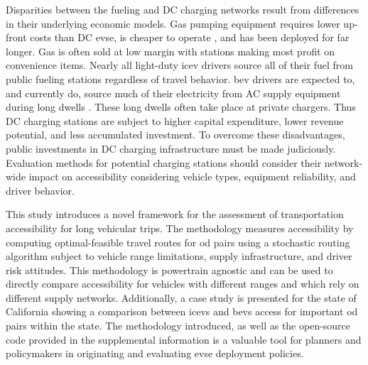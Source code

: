 Disparities between the fueling and DC charging networks result from differences in their underlying economic models. Gas pumping equipment requires lower up-front costs than DC \gls{evse}, is cheaper to operate \cite{Gamage_2023}, and has been deployed for far longer. Gas is often sold at low margin with stations making most profit on convenience items. Nearly all light-duty \gls{icev} drivers source all of their fuel from public fueling stations regardless of travel behavior. \gls{bev} drivers are expected to, and currently do, source much of their electricity from AC supply equipment during long dwells \cite{Hardman_2018}. These long dwells often take place at private chargers. Thus DC charging stations are subject to higher capital expenditure, lower revenue potential, and less accumulated investment. To overcome these disadvantages, public investments in DC charging infrastructure must be made judiciously. Evaluation methods for potential charging stations should consider their network-wide impact on accessibility considering vehicle types, equipment reliability, and driver behavior.

This study introduces a novel framework for the assessment of transportation accessibility for long vehicular trips. The methodology measures accessibility by computing optimal-feasible travel routes for \gls{od} pairs using a stochastic routing algorithm subject to vehicle range limitations, supply infrastructure, and driver risk attitudes. This methodology is powertrain agnostic and can be used to directly compare accessibility for vehicles with different ranges and which rely on different supply networks. Additionally, a case study is presented for the state of California showing a comparison between \glspl{icev} and \glspl{bev} access for important \gls{od} pairs within the state. The methodology introduced, as well as the open-source code provided in the supplemental information is a valuable tool for planners and policymakers in originating and evaluating \gls{evse} deployment policies.